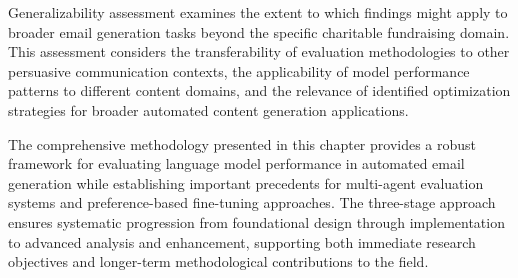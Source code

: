 Generalizability assessment examines the extent to which findings might apply to broader email generation tasks beyond the specific charitable fundraising domain. This assessment considers the transferability of evaluation methodologies to other persuasive communication contexts, the applicability of model performance patterns to different content domains, and the relevance of identified optimization strategies for broader automated content generation applications.


The comprehensive methodology presented in this chapter provides a robust framework for evaluating language model performance in automated email generation while establishing important precedents for multi-agent evaluation systems and preference-based fine-tuning approaches. The three-stage approach ensures systematic progression from foundational design through implementation to advanced analysis and enhancement, supporting both immediate research objectives and longer-term methodological contributions to the field.